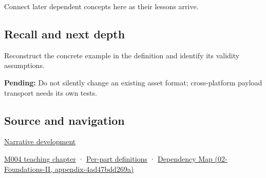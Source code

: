 Connect later dependent concepts here as their lessons arrive.

\subsection{Recall and next depth}\label{appendix-e90053a4b201-recall-and-next-depth}

Reconstruct the concrete example in the definition and identify its validity assumptions.

\textbf{Pending:} Do not silently change an existing asset format; cross-platform payload transport needs its own tests.

\subsection{Source and navigation}\label{appendix-e90053a4b201-source-and-navigation}

\hyperref[01-foundations-i-ch001-choosing-what-information-to-keep]{Narrative development}

\hyperref[01-foundations-i-ch001-a-stretching-ruler-for-real-valued-quantities]{M004 teaching chapter} · \hyperref[appendix-fd090d982a15-m004---parts-61-76]{Per-part definitions} · \href{../02-Foundations-II/main.pdf\#nameddest=appendix-4ad47bdd269a}{Dependency Map (02-Foundations-II, appendix-4ad47bdd269a)}
